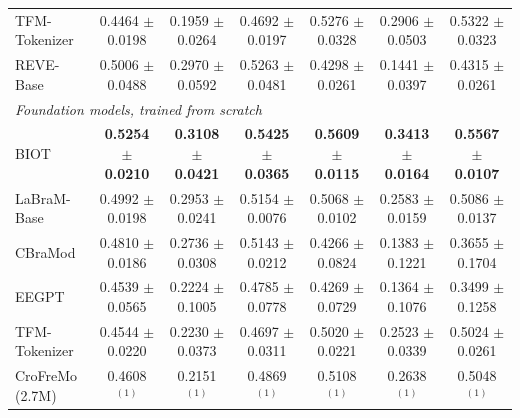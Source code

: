 \begin{table}[t]
{\begin{tabular}{lcccccc}
TFM-Tokenizer & 0.4464 $\pm$ 0.0198 & 0.1959 $\pm$ 0.0264 & 0.4692 $\pm$ 0.0197 & 0.5276 $\pm$ 0.0328 & 0.2906 $\pm$ 0.0503 & 0.5322 $\pm$ 0.0323 \\
REVE-Base & 0.5006 $\pm$ 0.0488 & 0.2970 $\pm$ 0.0592 & 0.5263 $\pm$ 0.0481 & 0.4298 $\pm$ 0.0261 & 0.1441 $\pm$ 0.0397 & 0.4315 $\pm$ 0.0261 \\
\midrule
\multicolumn{7}{l}{\textit{Foundation models, trained from scratch}} \\
BIOT & \textbf{0.5254 $\pm$ 0.0210} & \textbf{0.3108 $\pm$ 0.0421} & \textbf{0.5425 $\pm$ 0.0365} & \textbf{0.5609 $\pm$ 0.0115} & \textbf{0.3413 $\pm$ 0.0164} & \textbf{0.5567 $\pm$ 0.0107} \\
LaBraM-Base & 0.4992 $\pm$ 0.0198 & 0.2953 $\pm$ 0.0241 & 0.5154 $\pm$ 0.0076 & 0.5068 $\pm$ 0.0102 & 0.2583 $\pm$ 0.0159 & 0.5086 $\pm$ 0.0137 \\
CBraMod & 0.4810 $\pm$ 0.0186 & 0.2736 $\pm$ 0.0308 & 0.5143 $\pm$ 0.0212 & 0.4266 $\pm$ 0.0824 & 0.1383 $\pm$ 0.1221 & 0.3655 $\pm$ 0.1704 \\
EEGPT & 0.4539 $\pm$ 0.0565 & 0.2224 $\pm$ 0.1005 & 0.4785 $\pm$ 0.0778 & 0.4269 $\pm$ 0.0729 & 0.1364 $\pm$ 0.1076 & 0.3499 $\pm$ 0.1258 \\
TFM-Tokenizer & 0.4544 $\pm$ 0.0220 & 0.2230 $\pm$ 0.0373 & 0.4697 $\pm$ 0.0311 & 0.5020 $\pm$ 0.0221 & 0.2523 $\pm$ 0.0339 & 0.5024 $\pm$ 0.0261 \\
\midrule
CroFreMo (2.7M) & 0.4608$^{(1)}$ & 0.2151$^{(1)}$ & 0.4869$^{(1)}$ & 0.5108$^{(1)}$ & 0.2638$^{(1)}$ & 0.5048$^{(1)}$ \\
\bottomrule
\end{tabular}}
\end{table}

